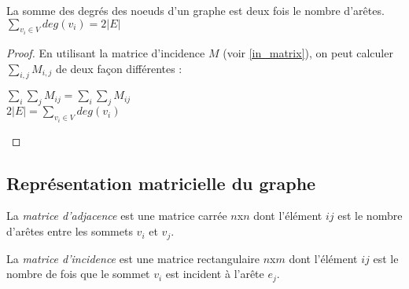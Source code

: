 \begin{mytheo} 
  La somme des degrés des noeuds d’un graphe est deux fois le nombre d’arêtes.\\
  $\sum_{v_i \in V}^{} deg(v_i) = 2|E|$
  \begin{proof}
    En utilisant la matrice d'incidence $M$ (voir \ref{in_matrix}), on peut calculer $\sum_{i,j}^{} M_{i,j}$ de deux façon différentes :\\
    \vspace*{5mm}
    \begin{center}
      $\sum_i \sum_j M_{ij} = \sum_i \sum_j M_{ij}$\\
      \vspace*{2mm}
      $2|E| = \sum_{v_i \in V} deg(v_i)$
    \end{center}
  \end{proof}
\end{mytheo}

\subsection{Représentation matricielle du graphe}
\begin{mydef}
  La \emph{matrice d'adjacence} est une matrice carrée $n$x$n$ dont l'élément $ij$ est le nombre d'arêtes entre les sommets $v_i$ et $v_j$.
\end{mydef}

\begin{mydef}
  \label{in_matrix}
  La \emph{matrice d'incidence} est une matrice rectangulaire $n$x$m$ dont l'élément $ij$ est le nombre de fois que le sommet $v_i$ est incident à l'arête $e_j$.
\end{mydef}

